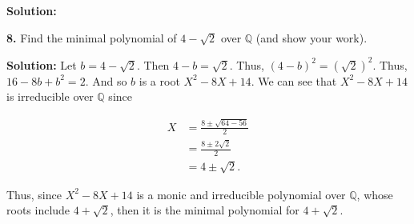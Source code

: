 \documentclass[12pt, a4paper]{article}
\begin{document}
\textbf{Solution:}

\vspace{6mm}

\noindent\textbf{8.} Find the minimal polynomial of $4-\sqrt{2}$ over $\mathbb{Q}$ (and show your work).

\vspace{4mm}

\noindent\textbf{Solution:} Let $b=4-\sqrt{2}$. Then $4-b=\sqrt{2}$. Thus, $(4-b)^2=(\sqrt{2})^2$. Thus, $16-8b+b^2=2$. And so $b$ is a root $X^2-8X+14$. We can see that $X^2-8X+14$ is irreducible over $\mathbb{Q}$ since

\begin{equation*}
        \begin{split}
            X &= \frac{8\pm\sqrt{64-56}}{2} \\
            &= \frac{8\pm 2\sqrt{2}}{2} \\
            &= 4\pm\sqrt{2}.
        \end{split}
    \end{equation*}
    
\vspace{4mm}

\noindent Thus, since $X^2-8X+14$ is a monic and irreducible polynomial over $\mathbb{Q}$, whose roots include $4+\sqrt{2}$, then it is the minimal polynomial for $4+\sqrt{2}$. 
 
\end{document}
